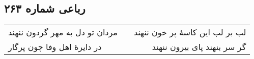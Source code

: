 \begin{center}
\section*{رباعی شماره ۲۶۳}
\label{sec:sh263}
\begin{longtable}{l p{0.5cm} r}
مردان تو دل به مهر گردون ننهند
&&
لب بر لب این کاسهٔ پر خون ننهند
\\
در دایرهٔ اهل وفا چون پرگار
&&
گر سر بنهند پای بیرون ننهند
\\
\end{longtable}
\end{center}

